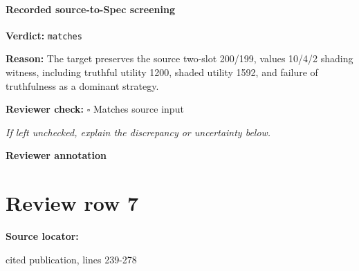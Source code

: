 \documentclass[10pt]{article}
\newcommand{\reviewerbox}{%
  \par\noindent\fbox{\parbox{0.96\linewidth}{\rule{0pt}{0.38in}}}\par
}
\newcommand{\reviewmatch}[1]{%
  \par\noindent\textbf{Reviewer check:} $\square$\; #1\par
  \noindent\emph{If left unchecked, explain the discrepancy or uncertainty below.}\par
}
\begin{document}
\paragraph{Recorded source-to-Spec screening}
\textbf{Verdict:} \texttt{matches}
\\
{\raggedright
\textbf{Reason:} The target preserves the source two-\allowbreak{}slot 200/\allowbreak{}199, values 10/\allowbreak{}4/\allowbreak{}2 shading witness, including truthful utility 1200, shaded utility 1592, and failure of truthfulness as a dominant strategy.\allowbreak{}
\par}
\reviewmatch{Matches source input}
\noindent\textbf{Reviewer annotation}\par
\reviewerbox
\clearpage
\hypertarget{source-claim-5798ec623309f406}{}
\section*{Review row 7}
\textbf{Source locator:} {\footnotesize\raggedright cited publication, lines 239-\allowbreak{}278\par}
\end{document}

